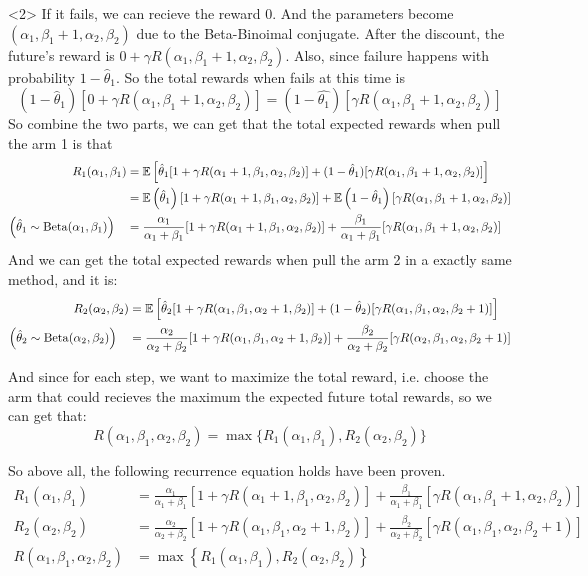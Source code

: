 \begin{homeworkProblem}
<2> If it fails, we can recieve the reward $0$. And the parameters become $(\alpha_1,\beta_1+1,\alpha_2,\beta_2)$ due to the Beta-Binoimal conjugate. After the discount, the future's reward is $0+\gamma R(\alpha_1,\beta_1+1,\alpha_2,\beta_2)$. Also, since failure happens with probability $1-\hat{\theta}_1$. So the total rewards when fails at this time is
$$(1-\hat{\theta}_1)[0+\gamma R(\alpha_1,\beta_1+1,\alpha_2,\beta_2)]=(1-\hat{\theta_1})[\gamma R(\alpha_1,\beta_1+1,\alpha_2,\beta_2)]$$
So combine the two parts, we can get that the total expected rewards when pull the arm 1 is that
\begin{align*}
R_1(\alpha_1,\beta_1) &= \mathbb{E}\left[\hat{\theta}_1[1+\gamma R(\alpha_1+1,\beta_1,\alpha_2,\beta_2)]+(1-\hat{\theta}_1)[\gamma R(\alpha_1,\beta_1+1,\alpha_2,\beta_2)]\right] \\
&= \mathbb{E}\left(\hat{\theta}_1\right)[1+\gamma R(\alpha_1+1,\beta_1,\alpha_2,\beta_2)]+\mathbb{E}\left(1-\hat{\theta}_1\right)[\gamma R(\alpha_1,\beta_1+1,\alpha_2,\beta_2)] \\
\left(\hat{\theta}_1\sim\operatorname{Beta}(\alpha_1,\beta_1)\right)\quad &= \dfrac{\alpha_1}{\alpha_1+\beta_1}[1+\gamma R(\alpha_1+1,\beta_1,\alpha_2,\beta_2)]+\dfrac{\beta_1}{\alpha_1+\beta_1}[\gamma R(\alpha_1,\beta_1+1,\alpha_2,\beta_2)]
\end{align*}
And we can get the total expected rewards when pull the arm 2 in a exactly same method, and it is:
\begin{align*}
R_2(\alpha_2,\beta_2) &= \mathbb{E}\left[\hat{\theta}_2[1+\gamma R(\alpha_1,\beta_1,\alpha_2+1,\beta_2)]+(1-\hat{\theta}_2)[\gamma R(\alpha_1,\beta_1,\alpha_2,\beta_2+1)]\right] \\
\left(\hat{\theta}_2\sim\operatorname{Beta}(\alpha_2,\beta_2)\right)\quad &= \dfrac{\alpha_2}{\alpha_2+\beta_2}[1+\gamma R(\alpha_1,\beta_1,\alpha_2+1,\beta_2)]+\dfrac{\beta_2}{\alpha_2+\beta_2}[\gamma R(\alpha_2,\beta_1,\alpha_2,\beta_2+1)]
\end{align*}

And since for each step, we want to maximize the total reward, i.e. choose the arm that could recieves the maximum the expected future total rewards, so we can get that:
$$R(\alpha_1,\beta_1,\alpha_2,\beta_2)=\max\{R_1(\alpha_1,\beta_1),R_2(\alpha_2,\beta_2)\}$$

So above all, the following recurrence equation holds have been proven.
\begin{align*}
R_1\left(\alpha_1, \beta_1\right) &= \frac{\alpha_1}{\alpha_1+\beta_1}\left[1+\gamma R\left(\alpha_1+1, \beta_1, \alpha_2, \beta_2\right)\right]+\frac{\beta_1}{\alpha_1+\beta_1}\left[\gamma R\left(\alpha_1, \beta_1+1, \alpha_2, \beta_2\right)\right] \\
R_2\left(\alpha_2, \beta_2\right) &= \frac{\alpha_2}{\alpha_2+\beta_2}\left[1+\gamma R\left(\alpha_1, \beta_1, \alpha_2+1, \beta_2\right)\right]+\frac{\beta_2}{\alpha_2+\beta_2}\left[\gamma R\left(\alpha_1, \beta_1, \alpha_2, \beta_2+1\right)\right] \\
R\left(\alpha_1, \beta_1, \alpha_2, \beta_2\right) &= \max \left\{R_1\left(\alpha_1, \beta_1\right), R_2\left(\alpha_2, \beta_2\right)\right\}
\end{align*}


\end{homeworkProblem}
